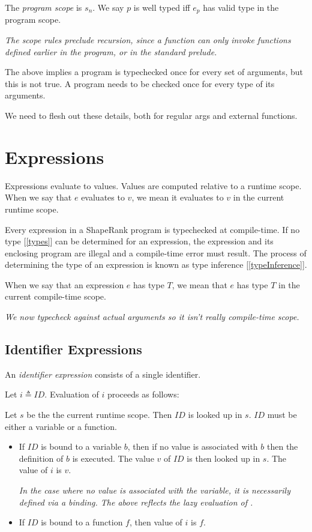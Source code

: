 \documentclass{article}
\begin{document}
The {\em program scope} is $s_n$.  
We say $p$ is well typed iff $e_p$ has valid type in the program scope.

{\em
The scope rules preclude recursion, since a function can only invoke functions defined earlier in the program, or in the standard prelude.
}

{\em 

The above implies a program is typechecked once for every set of  arguments, but this is not true.  A program needs to be checked once for every type of its arguments. 

We need to flesh out these details, both for regular args and external functions.

}

\section{Expressions}
\label{expressions}

Expressions evaluate to values. Values are computed relative to a runtime scope. When we say that $e$ evaluates to $v$, we mean it evaluates to $v$ in the current runtime scope.

\Expression{} 

Every expression in a ShapeRank program is typechecked at compile-time. If no type [\ref{types}] can be determined for an expression, the expression and its enclosing program are illegal and a compile-time error must result. The process of determining the type of an expression is known as type inference [\ref{typeInference}]. 

 When we say that an expression $e$ has type $T$, we mean that $e$ has type $T$ in the current compile-time scope.

{\em We now typecheck against actual arguments so it isn't really compile-time scope.}

\subsection{Identifier Expressions}
\label{identifierExpressions}

An {\em identifier expression} consists of a single identifier.

\IdentifierExpression{}

Let $i \triangleq ID$.
Evaluation of $i$ proceeds as follows:


Let $s$ be the the current runtime scope. Then $ID$ is looked up in $s$. $ID$ must be either a variable or a function.
\begin{itemize}
\item If $ID$ is bound to a variable $b$, then if no value is associated with $b$ then the definition of $b$ is executed. The value $v$ of $ID$ is then looked up in $s$. The value of $i$ is $v$.

{\em In the case where no value is associated with the variable, it is necessarily defined via  a \LET{} binding. The above reflects the lazy evaluation of \LET{}.}

\item If $ID$ is bound to a function $f$, then value of $i$ is $f$. 
\end{itemize}
\end{document}
